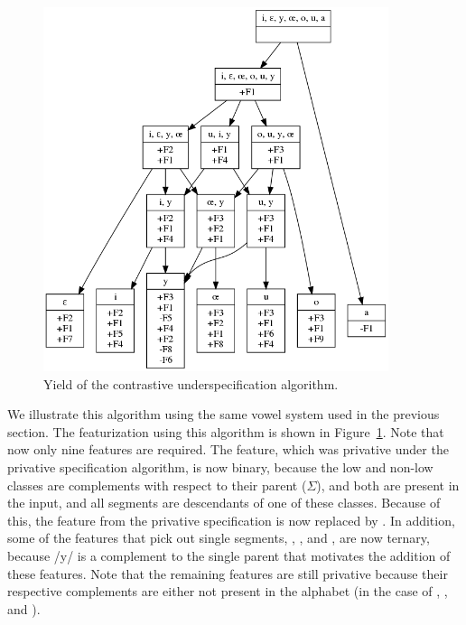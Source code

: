 \documentclass[11pt, oneside]{article}   	%
\begin{document}
\begin{figure}[htb!]
	\centering
	\includegraphics[width=0.9\textwidth]{vowel_inventory_contrastive_under.png}
	\caption{Yield of the contrastive underspecification algorithm.}
	\label{fig:vowel_inventory_contrastive_under}
\end{figure}

We illustrate this algorithm using the same vowel system used in the previous section. The featurization using this algorithm is shown in Figure~\ref{fig:vowel_inventory_contrastive_under}. Note that now only nine features are required. The  feature, which was privative under the privative specification algorithm, is now binary, because the low and non-low classes are complements with respect to their parent ($\Sigma$), and both are present in the input, and all segments are descendants of one of these classes. Because of this, the  feature from the privative specification is now replaced by . In addition, some of the features that pick out single segments, , , and , are now ternary, because /y/ is a complement to the single parent that motivates the addition of these features. Note that the remaining features are still privative because their respective complements are either not present in the alphabet (in the case of , , and ).
\end{document}

